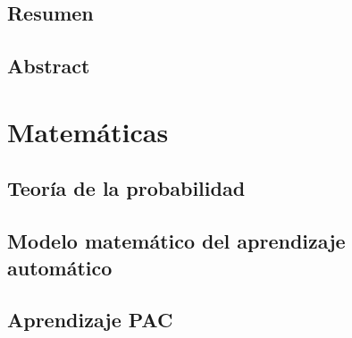 \documentclass[dottedtoc, headinclude, footinclude=true]{scrreprt}
\makeatletter
\def@path{{./frontmatter/}}
\makeatother
\begin{document}


\chapter*{Resumen}
  
\chapter*{Abstract}
  

\setcounter{tocdepth}{1}
\tableofcontents

\break 

\setcounter{page}{1}

\makeatletter
\makeatother




\part{Matemáticas}  
  \chapter{Teoría de la probabilidad}
    
  \chapter{Modelo matemático del aprendizaje automático}
    
  \chapter{Aprendizaje PAC}
    
\end{document}

